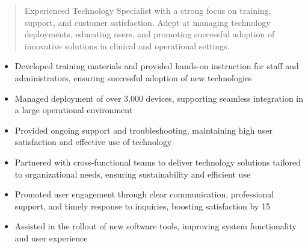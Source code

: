 



\makecvheader

\begin{quote}
  \noindent
  Experienced Technology Specialist with a strong focus on training, support, and customer satisfaction. Adept at managing technology deployments, educating users, and promoting successful adoption of innovative solutions in clinical and operational settings.
\end{quote}

\par\smallskip
\noindent
\begin{minipage}{20cm}
  \begin{minipage}{9.75cm}
    \begin{itemize}
      \item Developed training materials and provided hands-on instruction for staff and administrators, ensuring successful adoption of new technologies
      \item Managed deployment of over 3,000 devices, supporting seamless integration in a large operational environment
      \item Provided ongoing support and troubleshooting, maintaining high user satisfaction and effective use of technology
    \end{itemize}
  \end{minipage}
  \hfill
  \begin{minipage}{9.75cm}
    \begin{itemize}
      \item Partnered with cross-functional teams to deliver technology solutions tailored to organizational needs, ensuring sustainability and efficient use
      \item Promoted user engagement through clear communication, professional support, and timely response to inquiries, boosting satisfaction by 15%
      \item Assisted in the rollout of new software tools, improving system functionality and user experience
    \end{itemize}
  \end{minipage}
\end{minipage}
\par\smallskip
\divider

